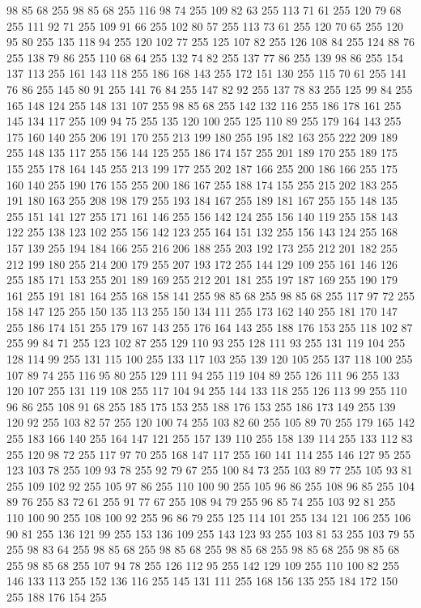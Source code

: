 98 85 68 255 98 85 68 255 116 98 74 255 109 82 63 255 113 71 61 255 120 79 68 255 111 92 71 255 109 91 66 255 102 80 57 255 113 73 61 255 120 70 65 255 120 95 80 255 135 118 94 255 120 102 77 255 125 107 82 255 126 108 84 255 124 88 76 255 138 79 86 255 110 68 64 255 132 74 82 255 137 77 86 255 139 98 86 255 154 137 113 255 161 143 118 255 186 168 143 255 172 151 130 255 115 70 61 255 141 76 86 255 145 80 91 255 141 76 84 255 147 82 92 255 137 78 83 255 125 99 84 255 165 148 124 255 148 131 107 255 98 85 68 255 142 132 116 255 186 178 161 255 145 134 117 255 109 94 75 255 135 120 100 255 125 110 89 255 179 164 143 255 175 160 140 255 206 191 170 255 213 199 180 255 195 182 163 255 222 209 189 255 148 135 117 255 156 144 125 255 186 174 157 255 201 189 170 255 189 175 155 255 178 164 145 255 213 199 177 255 202 187 166 255 200 186 166 255 175 160 140 255 190 176 155 255 200 186 167 255 188 174 155 255 215 202 183 255 191 180 163 255 208 198 179 255
193 184 167 255 189 181 167 255 155 148 135 255 151 141 127 255 171 161 146 255 156 142 124 255 156 140 119 255 158 143 122 255 138 123 102 255 156 142 123 255 164 151 132 255 156 143 124 255 168 157 139 255 194 184 166 255 216 206 188 255 203 192 173 255 212 201 182 255 212 199 180 255 214 200 179 255 207 193 172 255 144 129 109 255 161 146 126 255 185 171 153 255 201 189 169 255 212 201 181 255 197 187 169 255 190 179 161 255 191 181 164 255 168 158 141 255 98 85 68 255 98 85 68 255 117 97 72 255 158 147 125 255 150 135 113 255 150 134 111 255 173 162 140 255 181 170 147 255 186 174 151 255 179 167 143 255 176 164 143 255 188 176 153 255 118 102 87 255 99 84 71 255 123 102 87 255 129 110 93 255 128 111 93 255 131 119 104 255 128 114 99 255 131 115 100 255 133 117 103 255 139 120 105 255 137 118 100 255 107 89 74 255 116 95 80 255 129 111 94 255 119 104 89 255 126 111 96 255 133 120 107 255 131 119 108 255 117 104 94 255 144 133 118 255 126 113 99 255 110 96 86 255 108 91 68 255
185 175 153 255 188 176 153 255 186 173 149 255 139 120 92 255 103 82 57 255 120 100 74 255 103 82 60 255 105 89 70 255 179 165 142 255 183 166 140 255 164 147 121 255 157 139 110 255 158 139 114 255 133 112 83 255 120 98 72 255 117 97 70 255 168 147 117 255 160 141 114 255 146 127 95 255 123 103 78 255 109 93 78 255 92 79 67 255 100 84 73 255 103 89 77 255 105 93 81 255 109 102 92 255 105 97 86 255 110 100 90 255 105 96 86 255 108 96 85 255 104 89 76 255 83 72 61 255 91 77 67 255 108 94 79 255 96 85 74 255 103 92 81 255 110 100 90 255 108 100 92 255 96 86 79 255 125 114 101 255 134 121 106 255 106 90 81 255 136 121 99 255 153 136 109 255 143 123 93 255 103 81 53 255 103 79 55 255 98 83 64 255 98 85 68 255 98 85 68 255 98 85 68 255 98 85 68 255 98 85 68 255 98 85 68 255 107 94 78 255 126 112 95 255 142 129 109 255 110 100 82 255 146 133 113 255 152 136 116 255 145 131 111 255 168 156 135 255 184 172 150 255 188 176 154 255

